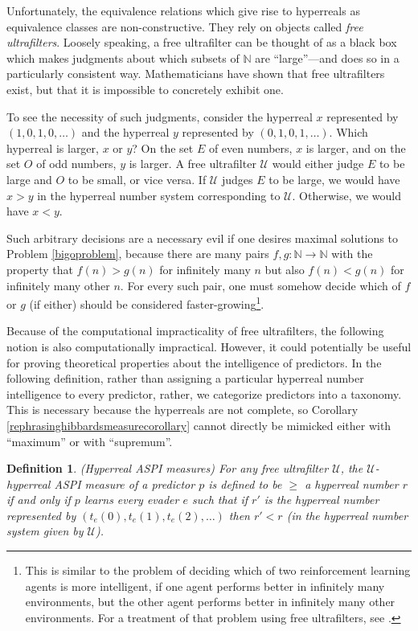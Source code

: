 \documentclass{article}
\newtheorem{definition}[theorem]{Definition}
\begin{document}
Unfortunately, the equivalence relations which give rise to hyperreals as
equivalence classes are non-constructive. They rely on objects called
\emph{free ultrafilters}.
Loosely speaking, a free ultrafilter can be thought
of as a black box which makes judgments about which subsets of $\mathbb N$
are ``large''---and does so in a particularly consistent way.
Mathematicians have shown that free ultrafilters
exist, but that it is impossible to concretely exhibit one.

To see the necessity of such judgments, consider the hyperreal
$x$ represented by $(1,0,1,0,\ldots)$ and the hyperreal $y$ represented by
$(0,1,0,1,\ldots)$. Which hyperreal is larger, $x$ or $y$? On the set $E$ of
even numbers, $x$ is larger, and on the set $O$ of odd numbers, $y$ is larger.
A free ultrafilter $\mathcal U$ would either judge
$E$ to be large and $O$ to be small,
or vice versa. If $\mathcal U$ judges $E$ to be large,
we would have $x>y$ in the hyperreal number system corresponding to $\mathcal U$.
Otherwise, we would have $x<y$.

Such arbitrary decisions are a necessary evil if one desires maximal solutions to
Problem \ref{bigoproblem}, because there are many pairs $f,g:\mathbb N\to\mathbb N$
with the property that $f(n)>g(n)$ for infinitely many $n$ but also $f(n)<g(n)$ for
infinitely many other $n$. For every such pair, one must
somehow decide which of $f$ or $g$ (if either) should be
considered faster-growing\footnote{This is similar to the problem of deciding which
of two reinforcement learning agents is more intelligent, if one agent
performs better in infinitely many environments, but the other agent performs
better in infinitely many other environments. For a treatment of that problem
using free ultrafilters, see \cite{alexander2019intelligence}.}.

Because of the computational impracticality of free ultrafilters, the following notion
is also computationally impractical. However, it could potentially be useful for
proving theoretical properties about the intelligence of predictors. In the following
definition, rather than assigning a particular hyperreal number intelligence to every
predictor, rather, we categorize predictors into a taxonomy. This is necessary because
the hyperreals are not complete, so Corollary \ref{rephrasinghibbardsmeasurecorollary}
cannot directly be mimicked either with ``maximum'' or with ``supremum''.

\begin{definition}
\label{hyperrealhibbardintelligencedefn}
    (Hyperreal ASPI measures)
    For any free ultrafilter $\mathcal U$,
    the \emph{$\mathcal U$-hyperreal ASPI measure} of a predictor $p$ is defined to be
    $\geq$ a hyperreal number $r$ if and only if $p$ learns every evader $e$
    such that if $r'$ is the hyperreal number represented by
    $(t_e(0), t_e(1), t_e(2), \ldots)$ then $r'<r$
    (in the hyperreal number system given by $\mathcal U$).
\end{definition}
\end{document}
